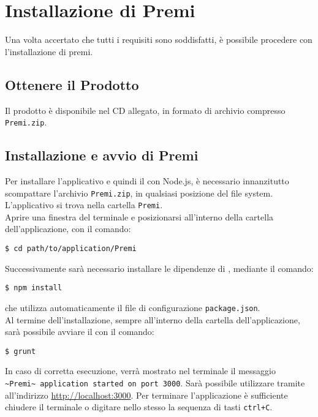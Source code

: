 \section{Installazione di Premi}\label{installazione}
Una volta accertato che tutti i requisiti sono soddisfatti, \`{e} possibile procedere con l'installazione di premi.
\subsection{Ottenere il Prodotto}
Il prodotto è disponibile nel CD allegato, in formato di archivio compresso \texttt{Premi.zip}.
\subsection{Installazione e avvio di Premi}
Per installare l'applicativo e quindi il  con Node.js, è necessario innanzitutto scompattare l'archivio \texttt{Premi.zip}, in qualsiasi posizione del file system. L'applicativo si trova nella cartella \texttt{Premi}. \\
Aprire una finestra del terminale e posizionarsi all'interno della cartella dell'applicazione, con il comando:
\begin{center}
\texttt{\$ cd path/to/application/Premi}
\end{center}
Successivamente sarà necessario installare le dipendenze di \Premi, mediante il comando:
\begin{center}
\texttt{\$ npm install}
\end{center}
che utilizza automaticamente il file di configurazione \texttt{package.json}.\\
Al termine dell'installazione, sempre all'interno della cartella dell'applicazione, sarà possibile avviare il  con il comando:
\begin{center}
\texttt{\$ grunt}
\end{center}
In caso di corretta esecuzione, verrà mostrato nel terminale il messaggio \texttt{\textasciitilde Premi\textasciitilde \ application started on port 3000}. Sarà possibile utilizzare \Premi tramite  all'indirizzo \url{http://localhost:3000}.
Per terminare l'applicazione è sufficiente chiudere il terminale o digitare nello stesso la sequenza di tasti \texttt{ctrl+C}.
